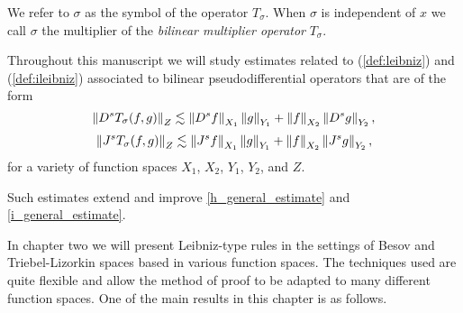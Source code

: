 We refer to $\sigma$ as the symbol of the operator $T_\sigma$. When $\sigma$ is independent of $x$ we call $\sigma$ the multiplier of the \textit{bilinear multiplier operator} $T_\sigma$. 


Throughout this manuscript we will study estimates related to (\ref{def:leibniz}) and (\ref{def:ileibniz}) associated to bilinear pseudodifferential operators that are of the form 
\begin{equation}\label{h_general_estimate}
\left\|D^s T_\sigma(f,g)\right\|_{Z} \lesssim \left\|D^sf\right\|_{X_1}\left\|g\right\|_{Y_1} + \left\|f\right\|_{X_2}\left\|D^s g\right\|_{Y_2} ,
\end{equation}
\begin{equation}\label{i_general_estimate}
\left\|J^sT_\sigma(f,g)\right\|_{Z} \lesssim \left\|J^sf\right\|_{X_1}\left\|g\right\|_{Y_1} + \left\|f\right\|_{X_2}\left\|J^sg\right\|_{Y_2} ,
\end{equation}
for a variety of function spaces $X_1$, $X_2$, $Y_1$, $Y_2$, and $Z$.



Such estimates extend and improve \ref{h_general_estimate} and \ref{i_general_estimate}. 

In chapter two we will present Leibniz-type rules in the settings of Besov and Triebel-Lizorkin spaces based in various function spaces. The techniques used are quite flexible and allow the method of proof to be adapted to many different function spaces. One of the main results in this chapter is as follows.

